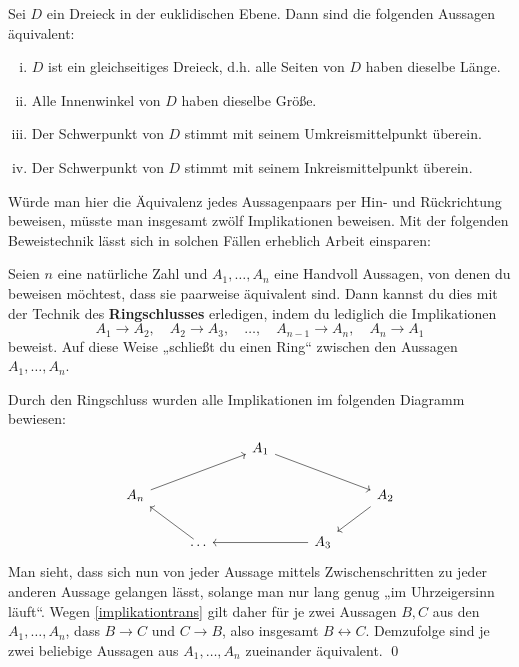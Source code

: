  
\begin{bsp}
    Sei $D$ ein Dreieck in der euklidischen Ebene. Dann sind die folgenden Aussagen äquivalent:
    \begin{enumerate}[(i)]
        \item $D$ ist ein gleichseitiges Dreieck, d.h. alle Seiten von $D$ haben dieselbe Länge.
        \item Alle Innenwinkel von $D$ haben dieselbe Größe.
        \item Der Schwerpunkt von $D$ stimmt mit seinem Umkreismittelpunkt überein.
        \item Der Schwerpunkt von $D$ stimmt mit seinem Inkreismittelpunkt überein.
    \end{enumerate}
Würde man hier die Äquivalenz jedes Aussagenpaars per Hin- und Rückrichtung beweisen, müsste man insgesamt zwölf Implikationen beweisen. Mit der folgenden Beweistechnik lässt sich in solchen Fällen erheblich Arbeit einsparen:
\end{bsp}


\begin{satz}[Ringschluss] \label{ringschluss} 
    Seien $n$ eine natürliche Zahl und $A_1,\dots , A_n$ eine Handvoll Aussagen, von denen du beweisen möchtest, dass sie paarweise äquivalent sind. Dann kannst du dies mit der Technik des \textbf{Ringschlusses} erledigen, indem du lediglich die Implikationen
        \[ A_1\to A_2,\quad A_2\to A_3,\quad \dots ,\quad A_{n-1}\to A_n,\quad A_n\to A_1 \]
    beweist. Auf diese Weise „schließt du einen Ring“ zwischen den Aussagen $A_1,\dots , A_n$.
\end{satz}


\begin{bew}
    Durch den Ringschluss wurden alle Implikationen im folgenden Diagramm bewiesen:
    \[\begin{tikzcd}
        &&& A_1 \ar[rrd] &&& \\
        &A_n\ar[rru]&&&& A_2 \ar[ld]& \\
        && \dots \ar[lu] && A_3 \ar[ll]&& 
    \end{tikzcd} \]
    Man sieht, dass sich nun von jeder Aussage mittels Zwischenschritten zu jeder anderen Aussage gelangen lässt, solange man nur lang genug „im Uhrzeigersinn läuft“. Wegen \cref{implikationtrans} gilt daher für je zwei Aussagen $B,C$ aus den $A_1,\dots , A_n$, dass $B\to C$ und $C\to B$, also insgesamt $B\leftrightarrow C$. Demzufolge sind je zwei beliebige Aussagen aus $A_1,\dots , A_n$ zueinander äquivalent. \qed
\end{bew}


